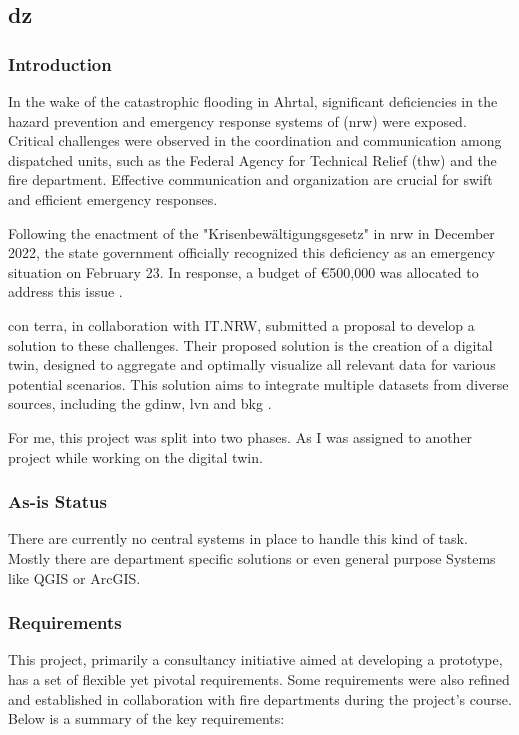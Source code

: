 \documentclass[11pt, titlepage, a4paper]{article}
\begin{document}
\subsection{\gls{dz}}
\subsubsection{Introduction}
In the wake of the catastrophic flooding in Ahrtal, significant deficiencies in the hazard prevention and emergency response systems of (\gls {nrw}) were exposed. Critical challenges were observed in the coordination and communication among dispatched units, such as the Federal Agency for Technical Relief (\gls{thw}) and the fire department. \cite{anna-laraweidingerAhrtalHochwasser2024} Effective communication and organization are crucial for swift and efficient emergency responses.

Following the enactment of the "Krisenbewältigungsgesetz" in \gls {nrw} in December 2022, the state government officially recognized this deficiency as an emergency situation on February 23. In response, a budget of €500,000 was allocated to address this issue \cite{landesregierungnordrhein-westfalenGesetzZurErrichtung2022}.

con terra, in collaboration with IT.NRW, submitted a proposal to develop a solution to these challenges. Their proposed solution is the creation of a digital twin, designed to aggregate and optimally visualize all relevant data for various potential scenarios. This solution aims to integrate multiple datasets from diverse sources, including the \gls{gdinw}, \gls{lvn} and \gls{bkg} \cite{caffier14GDIForumNordrheinWestfalen}.

For me, this project was split into two phases. As I was assigned to another project while working on the digital twin.

\subsubsection{As-is Status}
There are currently no central systems in place to handle this kind of task. Mostly there are department specific solutions or even general purpose Systems like QGIS or ArcGIS.


\subsubsection{Requirements}
This project, primarily a consultancy initiative aimed at developing a prototype, has a set of flexible yet pivotal requirements. Some requirements were also refined and established in collaboration with fire departments during the project's course. Below is a summary of the key requirements:
\end{document}
